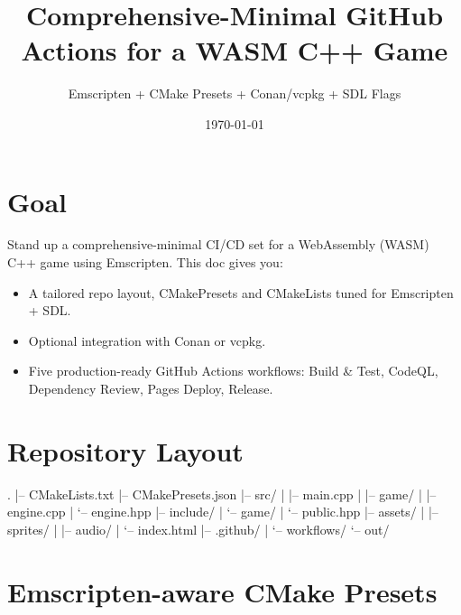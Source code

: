 \documentclass[11pt]{article}
\title{\textbf{Comprehensive-Minimal GitHub Actions for a WASM C++ Game}}
\author{Emscripten + CMake Presets + Conan/vcpkg + SDL Flags}
\date{\today}
\begin{document}
\maketitle

\section*{Goal}

Stand up a comprehensive-minimal CI/CD set for a WebAssembly (WASM) C++ game using Emscripten. This doc gives you:
\begin{itemize}
  \item A tailored repo layout, CMakePresets and CMakeLists tuned for Emscripten + SDL.
  \item Optional integration with Conan or vcpkg.
  \item Five production-ready GitHub Actions workflows: Build \& Test, CodeQL, Dependency Review, Pages Deploy, Release.
\end{itemize}

\section{Repository Layout}

\begin{textcode}
.
|-- CMakeLists.txt
|-- CMakePresets.json
|-- src/
|   |-- main.cpp
|   |-- game/
|       |-- engine.cpp
|       `-- engine.hpp
|-- include/
|   `-- game/
|       `-- public.hpp
|-- assets/
|   |-- sprites/
|   |-- audio/
|   `-- index.html
|-- .github/
|   `-- workflows/
`-- out/
\end{textcode}

\section{Emscripten-aware CMake Presets}

\end{document}
